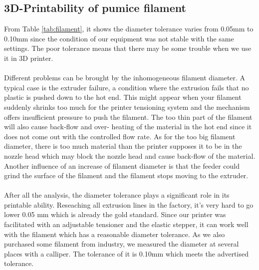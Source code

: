\subsection{3D-Printability of pumice filament}
From Table \ref{tab:filament}, it shows the diameter tolerance varies from 0.05mm to 0.10mm since the condition of our equipment was not stable with the same settings. The poor tolerance means that there may be some trouble when we use it in 3D printer.\\
\\
Different problems can be brought by the inhomogeneous filament diameter. A typical case is the extruder failure, a condition where the extrusion fails that no plastic is pushed down to the hot end. This might appear when your filament suddenly shrinks too much for the printer tensioning system and the mechanism offers insufficient pressure to push the filament. The too thin part of the filament will also cause back-flow and over- heating of the material in the hot end since it does not come out with the controlled flow rate. As for the too big filament diameter, there is too much material than the printer supposes it to be in the nozzle head which may block the nozzle head and cause back-flow of the material. Another influence of an increase of filament diameter is that the feeder could grind the surface of the filament and the filament stops moving to the extruder.\\
\\
After all the analysis, the diameter tolerance plays a significant role in its printable ability. Reseaching all extrusion lines in the factory, it’s very hard to go lower 0.05 mm which is already the gold standard. Since our printer was facilitated with an adjustable tensioner and the elastic stepper, it can work well with the filament which has a reasonable diameter tolerance. As we also purchased some filament from industry, we measured the diameter at several places with a calliper. The tolerance of it is 0.10mm which meets the advertised tolerance.\\
\\

